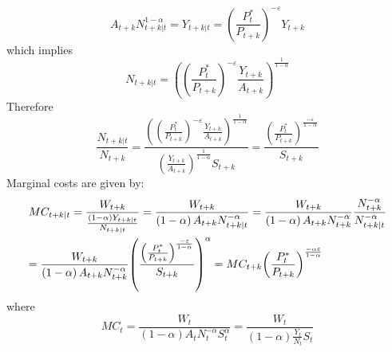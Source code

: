 \documentclass[12pt,a4paper]{article}
\begin{document}
\begin{equation}{A_{t + k}}N_{t + k|t}^{1 - \alpha } = {Y_{t + k|t}} = {\left( {\frac{{P_t^*}}{{{P_{t + k}}}}} \right)^{ - \varepsilon }}{Y_{t + k}}\end{equation}
which implies
\begin{equation}
{N_{t + k|t}} = {\left( {{{\left( {\frac{{P_t^*}}{{{P_{t + k}}}}} \right)}^{ - \varepsilon }}\frac{{{Y_{t + k}}}}{{{A_{t + k}}}}} \right)^{\frac{1}{{1 - \alpha }}}}
\end{equation}
Therefore
\begin{equation}\frac{{{N_{t + k|t}}}}{{{N_{t + k}}}} = \frac{{{{\left( {{{\left( {\frac{{P_t^*}}{{{P_{t + k}}}}} \right)}^{ - \varepsilon }}\frac{{{Y_{t + k}}}}{{{A_{t + k}}}}} \right)}^{\frac{1}{{1 - \alpha }}}}}}{{{{\left( {\frac{{{Y_{t + k}}}}{{{A_{t + k}}}}} \right)}^{\frac{1}{{1 - \alpha }}}}{S_{t+k}}}} = \frac{{{{\left( {\frac{{P_t^*}}{{{P_{t + k}}}}} \right)}^{\frac{{ - \varepsilon }}{{1 - \alpha }}}}}}{{{S_{t+k}}}}\end{equation}
Marginal costs are given by:
\[\begin{gathered}
  M{C_{t + k|t}} = \frac{{{W_{t + k}}}}{{\frac{{\left( {1 - \alpha } \right){Y_{t + k|t}}}}{{{N_{t + k|t}}}}}} = \frac{{{W_{t + k}}}}{{\left( {1 - \alpha } \right){A_{t + k}}N_{t + k|t}^{ - \alpha }}} = \frac{{{W_{t + k}}}}{{\left( {1 - \alpha } \right){A_{t + k}}N_{t + k}^{ - \alpha }}}\frac{{N_{t + k}^{ - \alpha }}}{{N_{t + k|t}^{ - \alpha }}} \hfill \\
   = \frac{{{W_{t + k}}}}{{\left( {1 - \alpha } \right){A_{t + k}}N_{t + k}^{ - \alpha }}}{\left( {\frac{{{{\left( {\frac{{P_t^*}}{{{P_{t + k}}}}} \right)}^{\frac{{ - \varepsilon }}{{1 - \alpha }}}}}}{{{S_{t + k}}}}} \right)^\alpha } = M{C_{t + k}}{\left( {\frac{{P_t^*}}{{{P_{t + k}}}}} \right)^{\frac{{ - \alpha \varepsilon }}{{1 - \alpha }}}} \hfill \\
\end{gathered} \]
where
\[
M{C_t} = \frac{{{W_t}}}{{\left( {1 - \alpha } \right){A_t}N_t^{ - \alpha }S_t^\alpha }} = \frac{{{W_{t}}}}{{\left( {1 - \alpha } \right)\frac{{{Y_t}}}{{{N_t}}}{S_t}}}
\]
\end{document}
